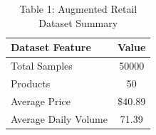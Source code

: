 
\begin{table}[h]
\centering
\begin{tabular}{|l|c|}
\hline
\textbf{Dataset Feature} & \textbf{Value} \\
\hline
Total Samples & 50000 \\
Products & 50 \\
Average Price & \$40.89 \\
Average Daily Volume & 71.39 \\
\hline
\end{tabular}
\caption{Table 1: Augmented Retail Dataset Summary}
\end{table}

